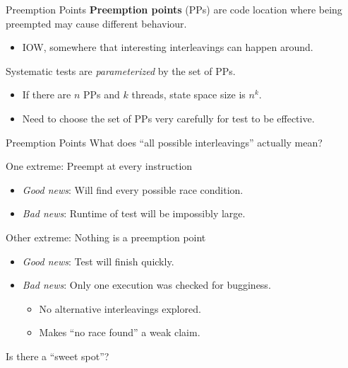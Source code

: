 \documentclass[xcolor=dvipsnames]{beamer}
\begin{document}
\begin{frame}{Preemption Points}
	\textbf{Preemption points} (PPs) are code location where being preempted may cause different behaviour.
	\begin{itemize}
		\item IOW, somewhere that interesting interleavings can happen around.
	\end{itemize}
	\linegap

	Systematic tests are {\em parameterized} by the set of PPs.
	\begin{itemize}
		\item If there are $n$ PPs and $k$ threads, state space size is $n^k$.
		\item Need to choose the set of PPs very carefully for test to be effective.
	\end{itemize}
\end{frame}


\begin{frame}{Preemption Points}
	What does ``all possible interleavings'' actually mean?

	\linegap
	One extreme: Preempt at every instruction
	\begin{itemize}
		\item {\em Good news}: Will find every possible race condition.
		\item {\em Bad news}: Runtime of test will be impossibly large.
	\end{itemize}
	\linegap

	Other extreme: Nothing is a preemption point
	\begin{itemize}
		\item {\em Good news}: Test will finish quickly.
		\item {\em Bad news}: Only one execution was checked for bugginess.
		\begin{itemize}
			\item No alternative interleavings explored.
			\item Makes ``no race found'' a weak claim.
		\end{itemize}
	\end{itemize}
	\linegap

	Is there a ``sweet spot''?
\end{frame}
\end{document}
